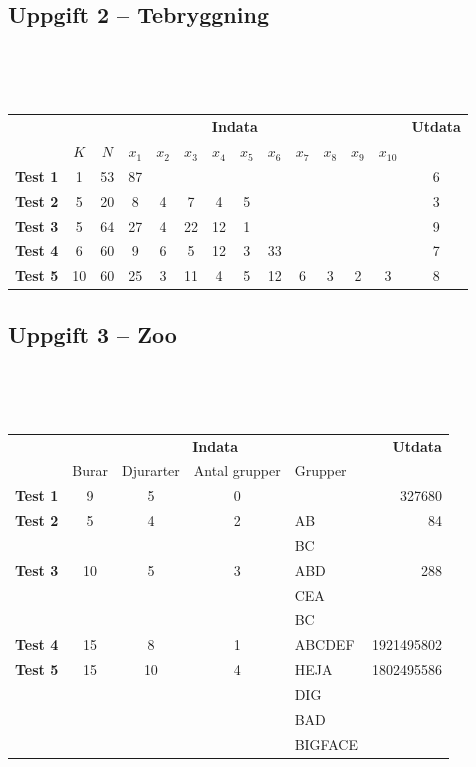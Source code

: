 \documentclass[a4paper,12pt,oneside]{amsbook}
\theoremstyle{test}
\newcommand{\fe}[1]{\textbf{#1}}            %
\begin{document}
\subsection*{Uppgift 2 -- Tebryggning}



~\\
{\tt 
\begin{tabular}{||l||c|c|c|c|c|c|c|c|c|c|c|c||c||}\hline\hline 
& \multicolumn{12}{c||}{\fe{Indata}} & \fe{Utdata} \\ 
& $K$ & $N$ & $x_1$ & $x_2$ & $x_3$ & $x_4$&$x_5$ & $x_6$& $x_7$& $x_8$& $x_9$& $x_{10}$& \\ \hline \hline
\fe{Test 1} &1 & 53 & 87 &&&&&&&&&& 6  \\ \hline 
\fe{Test 2} &5 & 20 & 8 &4& 7 &4 &5 &&&&&& 3  \\ \hline 
\fe{Test 3} &5 & 64 & 27& 4 &22 &12 &1 &&&&&& 9  \\ \hline 
\fe{Test 4} &6 & 60 & 9& 6& 5 &12 &3 &33 &&&&& 7  \\ \hline 
\fe{Test 5} &10 & 60 & 25& 3 &11 &4 &5 &12& 6& 3& 2& 3 & 8  \\ \hline
\hline
\end{tabular}
}




\subsection*{Uppgift 3 -- Zoo}


~\\
{\tt 
\begin{tabular}{||l||c|c|c|l||r||}\hline\hline
& \multicolumn{4}{c||}{\fe{Indata}} & \fe{Utdata} \\
& Burar & Djurarter & Antal grupper & Grupper & \\ \hline \hline
\fe{Test 1} & 9 & 5 & 0 && 327680 \\ \hline
\fe{Test 2} & 5 & 4 & 2 & AB & 84 \\
&&&&BC & \\ \hline
\fe{Test 3} & 10 & 5 & 3 & ABD & 288 \\
&&&&CEA & \\ 
&&&&BC & \\ \hline
\fe{Test 4} & 15 & 8 & 1 & ABCDEF & 1921495802\\ \hline
\fe{Test 5} & 15 & 10 & 4 & HEJA & 1802495586 \\
&&&&DIG & \\ 
&&&&BAD & \\ 
&&&&BIGFACE & \\ \hline \hline
\end{tabular}
}
   
\end{document}
